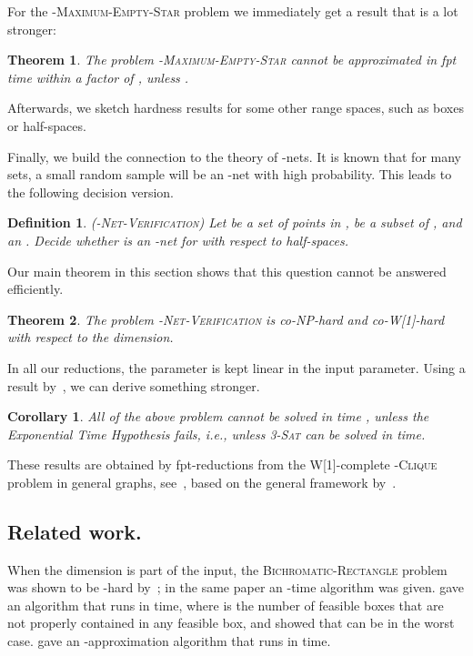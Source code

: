 \documentclass[12pt]{article}
\newtheorem{theorem}{Theorem}
\newtheorem{definition}{Definition}
\newtheorem{corollary}{Corollary}
\begin{document}
For the -\textsc{Maximum-Empty-Star} problem we immediately get a result that is a lot stronger:
\begin{theorem}\label{Thm:Inapproximability} The problem -\textsc{Maximum-Empty-Star} cannot be approximated in fpt time within a factor of , unless .
\end{theorem}


Afterwards, we sketch hardness results for some other range spaces, such as boxes or half-spaces.

Finally, we build the connection to the theory of -nets. It is known that for many sets, a small random sample will be an -net with high probability. This leads to the following decision version.
\begin{definition} (-\textsc{Net-Verification}) Let  be a set of points in ,  be a subset of , and an . Decide whether  is an -net for  with respect to half-spaces.
\end{definition}
Our main theorem in this section shows that this question cannot be answered efficiently.
\begin{theorem}\label{Thm:EpsilonNetMain} The problem -\textsc{Net-Verification} is co-NP-hard and co-W[1]-hard with respect to the dimension.
\end{theorem}

In all our reductions, the parameter  is kept linear in the input parameter. Using a result by~\cite{CCFHJKX05}, we can derive something stronger.
\begin{corollary}\label{Cor:LowerBoundMain} All of the above problem cannot be solved in time , unless the Exponential Time Hypothesis fails, i.e., unless \textsc{3-Sat} can be solved in  time.
\end{corollary}

These results are obtained by fpt-reductions from
the W[1]-complete -\textsc{Clique} problem in general graphs, see~\cite{DF99}, based
on the general framework by~\cite{cgkmr-gcfpt-09, CGKR08}.


\subsection{Related work.}
When the dimension is part of the input, the \textsc{Bichromatic-Rectangle} problem was shown to be -hard by~\cite{606903}; in the same paper an -time algorithm
was given. \cite{BK09} gave an algorithm that runs in
 time, where  is the number of feasible boxes
that are not properly contained in any feasible box, and showed
that  can be  in the worst case. \cite{AH08} gave an -approximation algorithm that
runs in  time.
\end{document}
